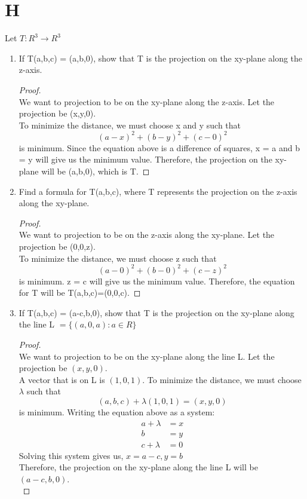 \documentclass[11pt]{scrartcl}
\begin{document}
\section{H} 
Let $T: R^3 \rightarrow R^3$
\begin{enumerate}[label=\alph*.]
	\item{
	If T(a,b,c) = (a,b,0), show that T is the projection on the xy-plane along the z-axis.	
	\begin{proof}
	\-\\
	We want to projection to be on the xy-plane along the z-axis. Let the projection be (x,y,0).\\
	To minimize the distance, we must choose x and y such that
	$$(a - x)^2 + (b - y)^2 + (c - 0)^2$$
	is minimum.
	Since the equation above is a difference of squares, x = a and b = y will give us the minimum value.
	Therefore, the projection on the xy-plane will be (a,b,0), which is T.
	\end{proof}
	}
	
	\item{
	Find a formula for T(a,b,c), where T represents the projection on the z-axis along the xy-plane.
	\begin{proof}
	\-\\
	We want to projection to be on the z-axis along the xy-plane. Let the projection be (0,0,z).\\
	To minimize the distance, we must choose z such that
	$$(a - 0)^2 + (b - 0)^2 + (c - z)^2$$
	is minimum.
	z = c will give us the minimum value.
	Therefore, the equation for T will be T(a,b,c)=(0,0,c).
	\end{proof}
	}

	\item{
	If T(a,b,c) = (a-c,b,0), show that T is the projection on the xy-plane along the line L $= \{(a,0,a):a \in R\}$
	\begin{proof}
	\-\\
	We want to projection to be on the xy-plane along the line L. Let the projection be $(x,y,0)$.\\
	A vector that is on L is $(1,0,1)$.
	To minimize the distance, we must choose $\lambda$ such that
	$$(a,b,c) + \lambda (1,0,1) = (x,y,0)$$
	is minimum. Writing the equation above as a system:
	\[
	\begin{aligned}
		a + \lambda &= x\\
		b &= y\\
		c + \lambda &= 0
	\end{aligned}
	\]
	Solving this system gives us, $x = a - c, y = b$\\ 
	Therefore, the projection on the xy-plane along the line L will be $(a-c,b,0)$.\\
	\end{proof}
	}

\end{enumerate}
\end{document}
